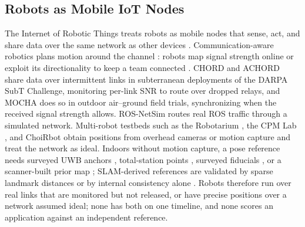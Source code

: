 \subsection{Robots as Mobile IoT Nodes}
The Internet of Robotic Things treats robots as mobile nodes that
sense, act, and share data over the same network as other devices
\cite{simoens2018iort}. Communication-aware robotics plans motion
around the channel \cite{muralidharan2021commaware}: robots map signal
strength online \cite{fink2010radiomap} or exploit its directionality
to keep a team connected \cite{gil2015adaptive}. CHORD and ACHORD
\cite{ginting2021chord,saboia2022achord} share data over intermittent
links in subterranean deployments of the DARPA SubT Challenge,
monitoring per-link SNR to route over dropped relays, and MOCHA
\cite{cladera2024mocha} does so in outdoor air--ground field trials,
synchronizing when the received signal strength allows. ROS-NetSim
\cite{calvofullana2021rosnetsim} routes real ROS traffic through a
simulated network. Multi-robot testbeds such as the Robotarium
\cite{wilson2021robotarium}, the CPM Lab \cite{kloock2021cpmlab}, and
ChoiRbot \cite{testa2021choirbot} obtain positions from overhead
cameras or motion capture and treat the network as ideal. Indoors
without motion capture, a pose reference needs surveyed UWB anchors
\cite{zhao2024util}, total-station points \cite{hilti2022}, surveyed
fiducials \cite{airmuseum}, or a scanner-built prior map
\cite{subtmrs,lamar}; SLAM-derived references are validated by sparse
landmark distances \cite{incrowdvi} or by internal consistency alone
\cite{envodat}. Robots therefore run over real links that are
monitored but not released, or have precise positions over a network
assumed ideal; none has both on one timeline, and none scores an
application against an independent reference.


